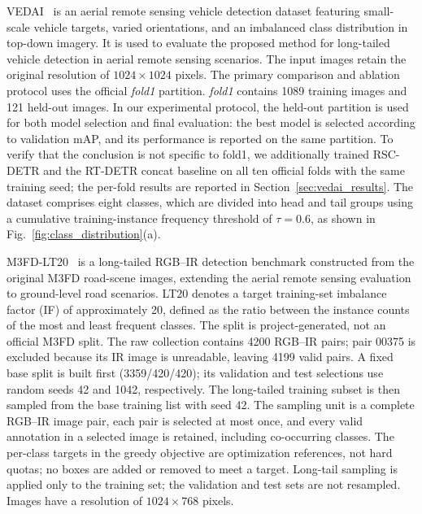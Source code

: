 \documentclass[letterpaper,journal]{IEEEtran}
\begin{document}
{VEDAI}~\cite{vedai} is an aerial remote sensing vehicle detection dataset
featuring small-scale vehicle targets, varied orientations,
and an imbalanced class distribution in top-down imagery.
It is used to evaluate the proposed method for long-tailed
vehicle detection in aerial remote sensing scenarios.
The input images retain the original resolution of
$1024\times1024$ pixels. The primary comparison and ablation
protocol uses the official \textit{fold1} partition.
\textit{fold1} contains 1089 training images and 121 held-out
images. In our experimental protocol, the held-out partition
is used for both model selection and final evaluation:
the best model is selected according to validation mAP,
and its performance is reported on the same partition.
To verify that the conclusion is not specific to fold1, we
additionally trained RSC-DETR and the RT-DETR concat baseline on
all ten official folds with the same training seed; the
per-fold results are reported in Section~\ref{sec:vedai_results}.
The dataset comprises eight classes, which are divided
into head and tail groups using a cumulative training-instance
frequency threshold of $\tau=0.6$, as shown in
Fig.~\ref{fig:class_distribution}(a).

{M3FD-LT20}~\cite{tardal_m3fd} is a long-tailed RGB--IR detection benchmark
constructed from the original M3FD road-scene images,
extending the aerial remote sensing evaluation to
ground-level road scenarios. LT20 denotes a target
training-set imbalance factor (IF) of approximately 20,
defined as the ratio between the instance counts of the
most and least frequent classes. The split is
project-generated, not an official M3FD split. The raw
collection contains 4200 RGB--IR pairs; pair 00375 is
excluded because its IR image is unreadable, leaving 4199
valid pairs. A fixed base split is built first
(3359/420/420); its validation and test selections use
random seeds 42 and 1042, respectively. The long-tailed
training subset is then sampled from the base training list
with seed 42. The sampling unit is a complete RGB--IR image
pair, each pair is selected at most once, and every valid
annotation in a selected image is retained, including
co-occurring classes. The per-class targets in the greedy
objective are optimization references, not hard quotas; no
boxes are added or removed to meet a target. Long-tail
sampling is applied only to the training set; the
validation and test sets are not resampled. Images have a
resolution of $1024\times768$ pixels.
\end{document}
